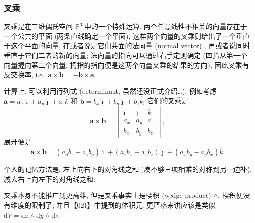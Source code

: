 \subsubsection{叉乘}
叉乘是在三维偶氏空间 \(\mathbb{R}^3\) 中的一个特殊运算,
两个任意线性不相关的向量存在于一个公共的平面 (两条直线确定一个平面),
这样两个向量的叉乘则给出了一个垂直于这个平面的向量,
在或者说是它们共面的法向量 (normal vector) ,
再或者说同时垂直于它们二者的新的向量; 法向量的指向可以通过右手定则确定
(四指从第一个向量握向第二个向量,
拇指的指向便是这两个向量叉乘的结果的方向), 因此叉乘有反交换率,
i.e.~\(\boldsymbol{a}\times\boldsymbol{b}=-\boldsymbol{b}\times\boldsymbol{a}\).

计算上, 可以利用行列式 (determinant, 虽然还没正式介绍\ldots),
例如考虑\(\boldsymbol{a}=a_x\hat{\imath}+a_y\hat{\jmath}+a_z\hat{k}\) 和
\(\boldsymbol{b}=b_x\hat{\imath}+b_y\hat{\jmath}+b_z\hat{k}\),
它们的叉乘是 \[
\boldsymbol{a}\times\boldsymbol{b}=\begin{vmatrix}\hat{\imath}&\hat{\jmath}&\hat{k}\\a_x&a_y&a_z\\b_x&b_y&b_z\end{vmatrix},
\] 展开便是 \[
\boldsymbol{a}\times\boldsymbol{b}=(a_yb_z-a_zb_y)\hat{\imath}+(a_zb_x-a_xb_z)\hat{\jmath}+(a_xb_y-a_yb_x)\hat{k}.
\]

\begin{newquote}
个人的记忆方法是, 左上向右下的对角线之和
(凑不够三项相乘的对称到另一边补), 减去右上向左下的对角线之和.
\end{newquote}

叉乘本身不能推广到更高维, 但是叉乘事实上是楔积 (wedge product)
\(\wedge\), 楔积便没有维度的限制了, 并且【021】中提到的体积元,
更严格来讲应该是类似
\(\mathrm{d}V=\mathrm{d}x\wedge\mathrm{d}y\wedge\mathrm{d}z\).

